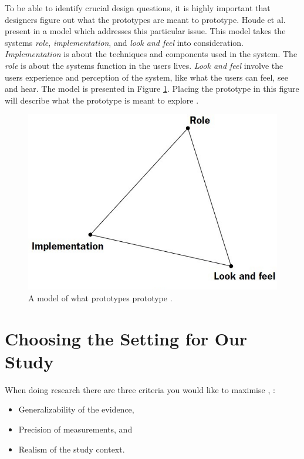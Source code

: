 To be able to identify crucial design questions, it is highly important that designers figure out what the prototypes are meant to prototype. Houde et al. present in \cite{houde1997prototypes} a model which addresses this particular issue. This model takes the systems \emph{role}, \emph{implementation}, and \emph{look and feel} into consideration. \emph{Implementation} is about the techniques and components used in the system. The \emph{role} is about the systems function in the users lives. \emph{Look and feel} involve the users experience and perception of the system, like what the users can feel, see and hear. The model is presented in Figure \ref{fig:prototype}. Placing the prototype in this figure will describe what the prototype is meant to explore \cite{houde1997prototypes}.    


\begin{figure} [H]
\centering
\includegraphics[scale=0.4]{trekant}
\caption[Prototype model]{A model of what prototypes prototype \cite{houde1997prototypes}.}
\label{fig:prototype}
\end{figure}

\section{Choosing the Setting for Our Study}
\label{sec:experimental}
When doing research there are three criteria you would like to maximise \cite{McGrath}, \cite{alsos}: 

\begin{itemize}
\item Generalizability of the evidence,
\item Precision of measurements, and 
\item Realism of the study context.  
\end{itemize}

